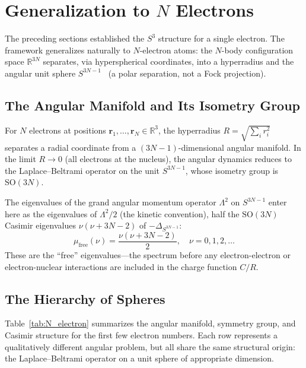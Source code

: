 \documentclass[aps,pra,twocolumn,superscriptaddress,longbibliography]{revtex4-2}
\begin{document}
\section{Generalization to $N$ Electrons}
\label{sec:N_electron}

The preceding sections established the $S^3$ structure for a single
electron.  The framework generalizes naturally to $N$-electron atoms:
the $N$-body configuration space $\mathbb{R}^{3N}$ separates, via
hyperspherical coordinates, into a hyperradius and the angular unit sphere
$S^{3N-1}$~\cite{loutey_paper13} (a polar separation, not a Fock
projection).

\subsection{The Angular Manifold and Its Isometry Group}

For $N$ electrons at positions $\bm{r}_1, \ldots, \bm{r}_N \in
\mathbb{R}^3$, the hyperradius $R = \sqrt{\sum_i r_i^2}$ separates
a radial coordinate from a $(3N-1)$-dimensional angular manifold.
In the limit $R \to 0$ (all electrons at the nucleus), the angular
dynamics reduces to the Laplace--Beltrami operator on the unit
$S^{3N-1}$, whose isometry group is $\mathrm{SO}(3N)$.

The eigenvalues of the grand angular momentum operator $\Lambda^2$
on $S^{3N-1}$ enter here as the eigenvalues of $\Lambda^2/2$ (the kinetic
convention), half the $\mathrm{SO}(3N)$ Casimir eigenvalues
$\nu(\nu + 3N - 2)$ of $-\Delta_{S^{3N-1}}$:
\begin{equation}
  \mu_{\mathrm{free}}(\nu) = \frac{\nu(\nu + 3N - 2)}{2},
  \quad \nu = 0, 1, 2, \ldots
  \label{eq:casimir_general}
\end{equation}
These are the ``free'' eigenvalues---the spectrum before any
electron-electron or electron-nuclear interactions are included
in the charge function $C/R$.

\subsection{The Hierarchy of Spheres}

Table~\ref{tab:N_electron} summarizes the angular manifold, symmetry
group, and Casimir structure for the first few electron numbers.
Each row represents a qualitatively different angular problem,
but all share the same structural origin: the Laplace--Beltrami
operator on a unit sphere of appropriate dimension.
\end{document}
